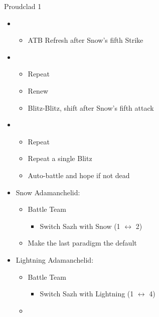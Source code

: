 \begin{multicols}{2}
\begin{battle}{Proudclad 1}
\begin{itemize}
\begin{itemize}
    \end{itemize}
    \item \sixth
    \begin{itemize}
        \item ATB Refresh after Snow's fifth Strike
    \end{itemize}
    \item \first
    \begin{itemize}
        \item Repeat
        \item Renew
        \item Blitz-Blitz, shift after Snow's fifth attack
    \end{itemize}
    \item \second
    \begin{itemize}
        \item Repeat
        \item Repeat a single Blitz
        \item Auto-battle and hope if not dead
    \end{itemize}
\end{itemize}
\end{battle}
\vfill
\begin{menu}
\begin{itemize}
    \item Snow Adamanchelid:
    \begin{itemize}
    \paradigm
    \begin{itemize}
        \item Battle Team
        \begin{itemize}
            \item Switch Sazh with Snow (1 $\leftrightarrow$ 2)
        \end{itemize}
        \item Make the last paradigm the default
    \end{itemize}
    \end{itemize}
    \item Lightning Adamanchelid:
    \begin{itemize}
    		\paradigm
    		\begin{itemize}
    		\item Battle Team
    		\begin{itemize}
    			\item Switch Sazh with Lightning (1 $\leftrightarrow$ 4)
    		\end{itemize}
    		        \item \paradigmdeckthree{%
}
\end{itemize}
\end{itemize}
\end{itemize}
\end{menu}
\end{multicols}
